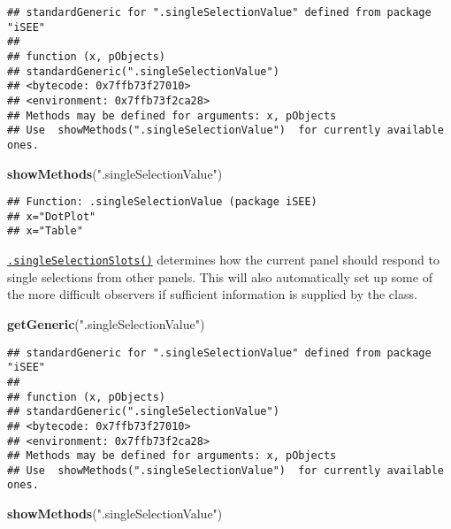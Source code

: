 \documentclass[
]{book}
\newenvironment{Shaded}{\begin{snugshade}}{\end{snugshade}}
\newcommand{\KeywordTok}[1]{\textcolor[rgb]{0.13,0.29,0.53}{\textbf{#1}}}
\newcommand{\NormalTok}[1]{#1}
\newcommand{\StringTok}[1]{\textcolor[rgb]{0.31,0.60,0.02}{#1}}
\begin{document}
\begin{verbatim}
## standardGeneric for ".singleSelectionValue" defined from package "iSEE"
## 
## function (x, pObjects) 
## standardGeneric(".singleSelectionValue")
## <bytecode: 0x7ffb73f27010>
## <environment: 0x7ffb73f2ca28>
## Methods may be defined for arguments: x, pObjects
## Use  showMethods(".singleSelectionValue")  for currently available ones.
\end{verbatim}

\begin{Shaded}
\begin{Highlighting}[]
\KeywordTok{showMethods}\NormalTok{(}\StringTok{".singleSelectionValue"}\NormalTok{)}
\end{Highlighting}
\end{Shaded}

\begin{verbatim}
## Function: .singleSelectionValue (package iSEE)
## x="DotPlot"
## x="Table"
\end{verbatim}

\href{https://isee.github.io/iSEE/reference/single-select-generics.html}{\texttt{.singleSelectionSlots()}} determines how the current panel should respond to single selections from other panels.
This will also automatically set up some of the more difficult observers if sufficient information is supplied by the class.

\begin{Shaded}
\begin{Highlighting}[]
\KeywordTok{getGeneric}\NormalTok{(}\StringTok{".singleSelectionValue"}\NormalTok{)}
\end{Highlighting}
\end{Shaded}

\begin{verbatim}
## standardGeneric for ".singleSelectionValue" defined from package "iSEE"
## 
## function (x, pObjects) 
## standardGeneric(".singleSelectionValue")
## <bytecode: 0x7ffb73f27010>
## <environment: 0x7ffb73f2ca28>
## Methods may be defined for arguments: x, pObjects
## Use  showMethods(".singleSelectionValue")  for currently available ones.
\end{verbatim}

\begin{Shaded}
\begin{Highlighting}[]
\KeywordTok{showMethods}\NormalTok{(}\StringTok{".singleSelectionValue"}\NormalTok{)}
\end{Highlighting}
\end{Shaded}
\end{document}
